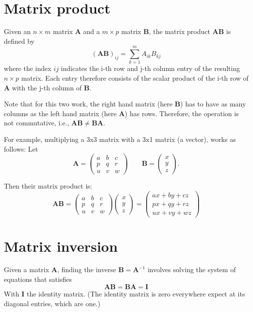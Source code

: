 \documentclass[paper=6.14in:9.21in,pagesize=pdftex,11pt,twoside,openright]{scrbook}
\begin{document}
\section{Matrix product}
Given an $n \times m$ matrix $\mathbf{A}$ and a $m\times p$ matrix $\mathbf{B}$, the matrix product $\mathbf{AB}$ is defined by
\begin{equation}
(\mathbf{AB})_{ij}=\sum_{k=1}^mA_{ik}B_{kj}
\end{equation}
where the index $ij$ indicates the i-th row and j-th column entry of the resulting $n\times p $ matrix. Each entry therefore consists of the scalar product of the i-th row of $\mathbf{A}$ with the j-th column of $\mathbf{B}$.

Note that for this two work, the right hand matrix (here $\mathbf{B}$) has to have as many columns as the left hand matrix (here $\mathbf{A}$) has rows. Therefore, the operation is not commutative, i.e., $\mathbf{AB}\neq\mathbf{BA}$.

For example, multiplying a 3x3 matrix with a 3x1 matrix (a vector), works as follows:
Let
\begin{equation}\nonumber
\mathbf{A} = \begin{pmatrix}
a & b & c \\
p & q & r \\
u & v & w
\end{pmatrix} \qquad \mathbf{B} = \begin{pmatrix}
x \\
y \\
z
\end{pmatrix}.
\end{equation}

Then their matrix product is:
\begin{equation}\nonumber
\mathbf{AB} = \begin{pmatrix}
a & b & c \\
p & q & r \\
u & v & w
\end{pmatrix} \begin{pmatrix}
x \\
y \\
z
\end{pmatrix} =\begin{pmatrix}
ax + by + cz \\
px + qy + rz \\
ux + vy + wz
\end{pmatrix}
\end{equation}

\section{Matrix inversion}
Given a matrix $\mathbf{A}$, finding the inverse $\mathbf{B}=\mathbf{A}^{-1}$ involves solving the system of equations that satisfies
\begin{equation}
\mathbf{AB}=\mathbf{BA}=\mathbf{I}
\end{equation}
With $\mathbf{I}$ the identity matrix. (The identity matrix is zero everywhere expect at its diagonal entries, which are one.)
\end{document}
